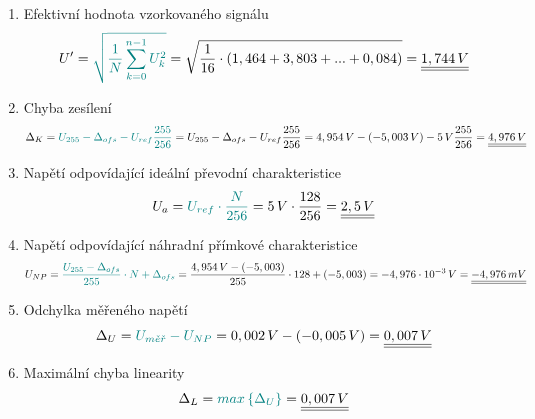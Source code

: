 \documentclass[a4paper, czech]{article}
\begin{document}
\begin{enumerate}
    \item Efektivní hodnota vzorkovaného signálu
    \begin{multline*}
        U' = \textcolor{teal}{\sqrt{\frac{1}{N} \sum_{k=0}^{n-1} U_k^2}} = \sqrt{\frac{1}{16} \cdot \left( 1,464 + 3,803 + ... + 0,084 \right)} = \underline{\underline{1,744\,V}} \hfill
    \end{multline*}

    \item Chyba zesílení
    \begin{multline*}
        \Delta_K = \textcolor{teal}{U_{255} - \Delta_{ofs} - U_{ref} \frac{255}{256}} = U_{255} - \Delta_{ofs} - U_{ref} \frac{255}{256} = 4,954\,V - (-5,003\,V) - 5\,V \frac{255}{256} = \underline{\underline{4,976\,V}} \hfill
    \end{multline*}

    \item Napětí odpovídající ideální převodní charakteristice
    \begin{multline*}
        U_a = \textcolor{teal}{U_{ref} \cdot \frac{N}{256}} = 5\,V \cdot \frac{128}{256} = \underline{\underline{2,5\,V}} \hfill
    \end{multline*}

    \item Napětí odpovídající náhradní přímkové charakteristice
    \begin{multline*}
        U_{NP} = \textcolor{teal}{\frac{U_{255} - \Delta_{ofs}}{255} \cdot N + \Delta_{ofs}} = \frac{4,954\,V - (-5,003)}{255} \cdot 128 + (-5,003) = -4,976 \cdot 10^{-3}\,V = \underline{\underline{-4,976\,mV}} \hfill
    \end{multline*}

    \item Odchylka měřeného napětí
    \begin{multline*}
        \Delta_U = \textcolor{teal}{U_{m \check{e} \check{r}} - U_{NP}} = 0,002\,V - (-0,005\,V) = \underline{\underline{0,007\,V}} \hfill
    \end{multline*}

    \item Maximální chyba linearity
    \begin{multline*}
        \Delta_L = \textcolor{teal}{max \left\{\Delta_U\right\}} = \underline{\underline{0,007\,V}} \hfill
    \end{multline*}
\end{enumerate}
\end{document}
